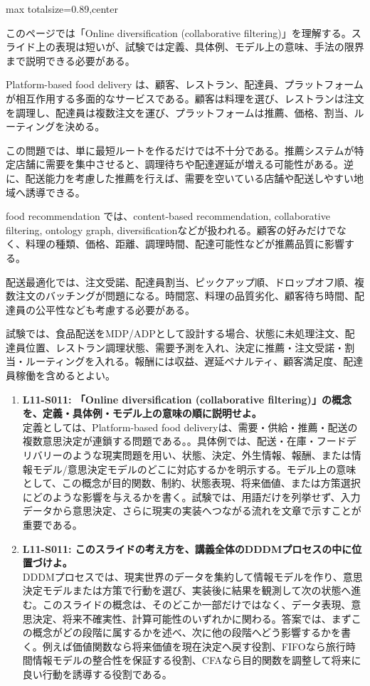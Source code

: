 \begin{minipage}[t]{0.58\textwidth}
\begin{adjustbox}{max totalsize={\textwidth}{0.89\textheight},center}
\begin{minipage}{\textwidth}\scriptsize
{}このページでは「Online diversification (collaborative filtering)」を理解する。スライド上の表現は短いが、試験では定義、具体例、モデル上の意味、手法の限界まで説明できる必要がある。\par
Platform-based food delivery は、顧客、レストラン、配達員、プラットフォームが相互作用する多面的なサービスである。顧客は料理を選び、レストランは注文を調理し、配達員は複数注文を運び、プラットフォームは推薦、価格、割当、ルーティングを決める。\par
この問題では、単に最短ルートを作るだけでは不十分である。推薦システムが特定店舗に需要を集中させると、調理待ちや配達遅延が増える可能性がある。逆に、配送能力を考慮した推薦を行えば、需要を空いている店舗や配送しやすい地域へ誘導できる。\par
food recommendation では、content-based recommendation, collaborative filtering, ontology graph, diversificationなどが扱われる。顧客の好みだけでなく、料理の種類、価格、距離、調理時間、配達可能性などが推薦品質に影響する。\par
配送最適化では、注文受諾、配達員割当、ピックアップ順、ドロップオフ順、複数注文のバッチングが問題になる。時間窓、料理の品質劣化、顧客待ち時間、配達員の公平性なども考慮する必要がある。\par
試験では、食品配送をMDP/ADPとして設計する場合、状態に未処理注文、配達員位置、レストラン調理状態、需要予測を入れ、決定に推薦・注文受諾・割当・ルーティングを入れる。報酬には収益、遅延ペナルティ、顧客満足度、配達員稼働を含めるとよい。\par{}\begin{enumerate}\item \textbf{L11-S011: 「Online diversification (collaborative filtering)」の概念を、定義・具体例・モデル上の意味の順に説明せよ。}\\定義としては、Platform-based food deliveryは、需要・供給・推薦・配送の複数意思決定が連鎖する問題である。。具体例では、配送・在庫・フードデリバリーのような現実問題を用い、状態、決定、外生情報、報酬、または情報モデル/意思決定モデルのどこに対応するかを明示する。モデル上の意味として、この概念が目的関数、制約、状態表現、将来価値、または方策選択にどのような影響を与えるかを書く。試験では、用語だけを列挙せず、入力データから意思決定、さらに現実の実装へつながる流れを文章で示すことが重要である。\item \textbf{L11-S011: このスライドの考え方を、講義全体のDDDMプロセスの中に位置づけよ。}\\DDDMプロセスでは、現実世界のデータを集約して情報モデルを作り、意思決定モデルまたは方策で行動を選び、実装後に結果を観測して次の状態へ進む。このスライドの概念は、そのどこか一部だけではなく、データ表現、意思決定、将来不確実性、計算可能性のいずれかに関わる。答案では、まずこの概念がどの段階に属するかを述べ、次に他の段階へどう影響するかを書く。例えば価値関数なら将来価値を現在決定へ戻す役割、FIFOなら旅行時間情報モデルの整合性を保証する役割、CFAなら目的関数を調整して将来に良い行動を誘導する役割である。\end{enumerate}

\end{minipage}
\end{adjustbox}
\end{minipage}
